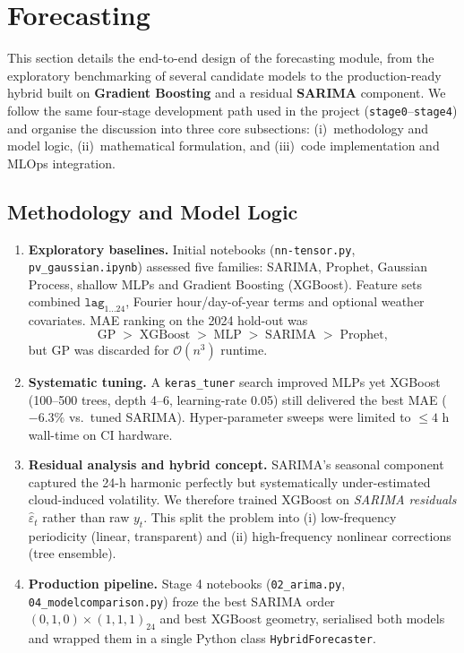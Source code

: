 \section{Forecasting}
\label{sec:forecasting}

This section details the end-to-end design of the forecasting module, from the exploratory benchmarking of several candidate models to the production-ready hybrid built on \textbf{Gradient Boosting} and a residual \textbf{SARIMA} component.  
We follow the same four-stage development path used in the project (\texttt{stage0}–\texttt{stage4}) and organise the discussion into three core subsections: (i)~methodology and model logic, (ii)~mathematical formulation, and (iii)~code implementation and MLOps integration.

\subsection{Methodology and Model Logic}
\label{ssec:fcast-method}

\begin{enumerate}[label=\textbf{Stage \arabic*:},leftmargin=1.9cm]
  \item \textbf{Exploratory baselines.}  
        Initial notebooks (\texttt{nn-tensor.py}, \texttt{pv\_gaussian.ipynb}) assessed five families: SARIMA, Prophet, Gaussian Process, shallow MLPs and Gradient Boosting (XGBoost).  
        Feature sets combined \(\mathtt{lag}_{1\dots24}\), Fourier hour/day-of-year terms and optional weather covariates.  MAE ranking on the 2024 hold-out was  
        \[
          \text{GP} \;{>} \; \text{XGBoost} \;{>} \; \text{MLP} \;{>} \; \text{SARIMA} \;{>} \; \text{Prophet},
        \]
        but GP was discarded for \(\mathcal{O}(n^3)\) runtime.

  \item \textbf{Systematic tuning.}  
        A \texttt{keras\_tuner} search improved MLPs yet XGBoost (100–500 trees, depth 4–6, learning-rate 0.05) still delivered the best MAE (${-}6.3\%$ vs.\ tuned SARIMA).  
        Hyper-parameter sweeps were limited to \(\leq 4\text{ h}\) wall-time on CI hardware.

  \item \textbf{Residual analysis and hybrid concept.}  
        SARIMA’s seasonal component captured the 24-h harmonic perfectly but systematically under-estimated cloud-induced volatility.  
        We therefore trained XGBoost on \emph{SARIMA residuals} \(\hat\varepsilon_t\) rather than raw \(y_t\).  
        This split the problem into (i) low-frequency periodicity (linear, transparent) and (ii) high-frequency nonlinear corrections (tree ensemble).

  \item \textbf{Production pipeline.}  
        Stage 4 notebooks (\texttt{02\_arima.py}, \texttt{04\_modelcomparison.py}) froze the best SARIMA order \((0,1,0)\!\times\!(1,1,1)_{24}\) and best XGBoost geometry, serialised both models and wrapped them in a single Python class \texttt{HybridForecaster}.
\end{enumerate}

